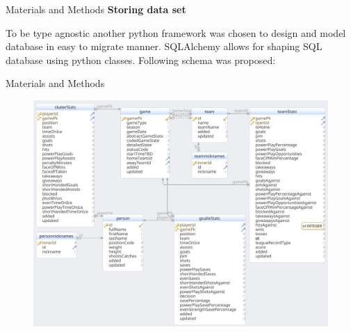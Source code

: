 \begin{frame}{Materials and Methods}
    \textbf{Storing data set}\\
    \vspace{2em}
   
    To be type agnostic another python framework was chosen to design and model database in easy to migrate manner. SQLAlchemy allows for shaping SQL database using python classes. Following schema was proposed:
\end{frame}

\begin{frame}{Materials and Methods}
    \begin{figure}[H]
        \includegraphics[height=0.9\textheight]{dbschema}
    \end{figure}
\end{frame}

